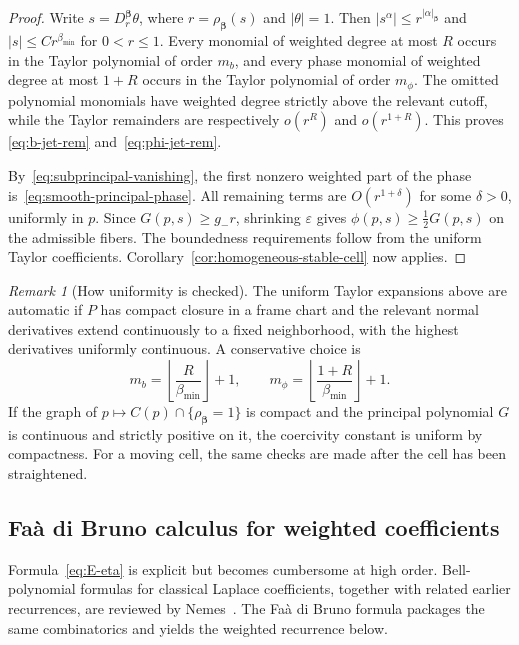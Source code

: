 \documentclass[11pt]{amsart}
\numberwithin{equation}{section}
\theoremstyle{definition}
\theoremstyle{remark}
\newtheorem{remark}[theorem]{Remark}
\newcommand{\eps}{\varepsilon}
\begin{document}
\begin{proof}
Write $s=D_r^{\bm\beta}\theta$, where
$r=\rho_{\bm\beta}(s)$ and $|\theta|=1$.  Then
$|s^\alpha|\le r^{|\alpha|_{\bm\beta}}$ and
$|s|\le C r^{\beta_{\min}}$ for $0<r\le1$.  Every monomial of weighted degree
at most $R$ occurs in the Taylor polynomial of order $m_b$, and every phase
monomial of weighted degree at most $1+R$ occurs in the Taylor polynomial of
order $m_\phi$.  The omitted polynomial monomials have weighted degree strictly
above the relevant cutoff, while the Taylor remainders are respectively
$o(r^R)$ and $o(r^{1+R})$.  This proves
\eqref{eq:b-jet-rem} and~\eqref{eq:phi-jet-rem}.

By~\eqref{eq:subprincipal-vanishing}, the first nonzero weighted part of the
phase is~\eqref{eq:smooth-principal-phase}.  All remaining terms are
$O(r^{1+\delta})$ for some $\delta>0$, uniformly in $p$.  Since
$G(p,s)\ge g_-r$, shrinking $\eps$ gives
$\phi(p,s)\ge\frac12 G(p,s)$ on the admissible fibers.  The boundedness
requirements follow from the uniform Taylor coefficients.
Corollary~\ref{cor:homogeneous-stable-cell} now applies.
\end{proof}

\begin{remark}[How uniformity is checked]\label{rem:uniformity-check}
The uniform Taylor expansions above are automatic if $P$ has compact closure in
a frame chart and the relevant normal derivatives extend continuously to a
fixed neighborhood, with the highest derivatives uniformly continuous.  A
conservative choice is
\[
 m_b=\left\lfloor\frac{R}{\beta_{\min}}\right\rfloor+1,
 \qquad
 m_\phi=\left\lfloor\frac{1+R}{\beta_{\min}}\right\rfloor+1.
\]
If the graph of $p\mapsto C(p)\cap\{\rho_{\bm\beta}=1\}$ is compact and the
principal polynomial $G$ is continuous and strictly positive on it, the
coercivity constant is uniform by compactness.  For a moving cell, the same
checks are made after the cell has been straightened.
\end{remark}

\subsection{Fa\`a di Bruno calculus for weighted coefficients}\label{subsec:faa-di-bruno}

Formula~\eqref{eq:E-eta} is explicit but becomes cumbersome at high order.
Bell-polynomial formulas for classical Laplace coefficients, together with
related earlier recurrences, are reviewed by Nemes~\cite{Nemes}.  The Fa\`a di
Bruno formula packages the same combinatorics and yields the weighted recurrence
below.
\end{document}
